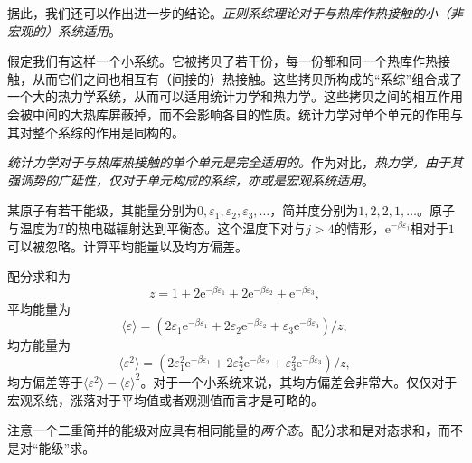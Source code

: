 据此，我们还可以作出进一步的结论。{\it 正则系综理论对于与热库作热接触的小（非宏观的）系统适用}。

假定我们有这样一个小系统。它被拷贝了若干份，每一份都和同一个热库作热接触，从而它们之间也相互有（间接的）热接触。这些拷贝所构成的“系综”组合成了一个大的热力学系统，从而可以适用统计力学和热力学。这些拷贝之间的相互作用会被中间的大热库屏蔽掉，而不会影响各自的性质。统计力学对单个单元的作用与其对整个系综的作用是同构的。

{\it 统计力学对于与热库热接触的单个单元是完全适用的。}作为对比，{\it 热力学，由于其强调势的广延性，仅对于单元构成的系综，亦或是宏观系统适用}。

\begin{example}
某原子有若干能级，其能量分别为$0,\varepsilon_1,\varepsilon_2,\varepsilon_3,\dots$，简并度分别为$1,2,2,1,\dots$。原子与温度为$T$的热电磁辐射达到平衡态。这个温度下对与$j>4$的情形，$\mathrm e^{-\beta\varepsilon_j}$相对于$1$可以被忽略。计算平均能量以及均方偏差。


配分求和为
\begin{equation*}
z = 1+2\mathrm e^{-\beta\varepsilon_1}+2\mathrm e^{-\beta\varepsilon_2}+\mathrm e^{-\beta\varepsilon_3},
\end{equation*}
平均能量为
\begin{equation*}
\langle\varepsilon\rangle = \left(2\varepsilon_1\mathrm e^{-\beta\varepsilon_1}+2\varepsilon_2\mathrm e^{-\beta\varepsilon_2}+\varepsilon_3\mathrm e^{-\beta\varepsilon_3}\right)/z,
\end{equation*}
均方能量为
\begin{equation*}
\langle\varepsilon^2\rangle = \left(2\varepsilon_1^2\mathrm e^{-\beta\varepsilon_1}+2\varepsilon_2^2\mathrm e^{-\beta\varepsilon_2}+\varepsilon_3^2\mathrm e^{-\beta\varepsilon_3}\right)/z,
\end{equation*}
均方偏差等于$\langle\varepsilon^2\rangle-\langle\varepsilon\rangle^2$。对于一个小系统来说，其均方偏差会非常大。仅仅对于宏观系统，涨落对于平均值或者观测值而言才是可略的。

注意一个二重简并的能级对应具有相同能量的{\it 两个态}。配分求和是对态求和，而不是对“能级”求。
\end{example}

